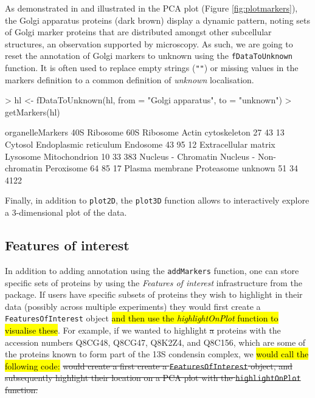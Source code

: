As demonstrated in \cite{hyper} and illustrated in the PCA plot
(Figure \ref{fig:plotmarkers}), the Golgi apparatus proteins (dark
brown) display a dynamic pattern, noting sets of Golgi marker proteins
that are distributed amongst other subcellular structures, an
observation supported by microscopy.  As such, we are going to reset
the annotation of Golgi markers to unknown using the
\texttt{fDataToUnknown} function. It is often used to replace empty
strings (\texttt{""}) or missing values in the markers definition to a
common definition of \textit{unknown} localisation.

\begin{Schunk}
\begin{Sinput}
> hl <- fDataToUnknown(hl, from = "Golgi apparatus", to = "unknown")
> getMarkers(hl)
\end{Sinput}
\begin{Soutput}
organelleMarkers
           40S Ribosome            60S Ribosome      Actin cytoskeleton 
                     27                      43                      13 
                Cytosol   Endoplasmic reticulum                Endosome 
                     43                      95                      12 
   Extracellular matrix                Lysosome           Mitochondrion 
                     10                      33                     383 
    Nucleus - Chromatin Nucleus - Non-chromatin              Peroxisome 
                     64                      85                      17 
        Plasma membrane              Proteasome                 unknown 
                     51                      34                    4122 
\end{Soutput}
\end{Schunk}

Finally, in addition to \texttt{plot2D}, the \texttt{plot3D} function
allows to interactively explore a 3-dimensional plot of the data.

\subsection*{Features of interest}
In addition to adding annotation using the \texttt{addMarkers}
function, one can store specific sets of proteins by using the
\textit{Features of interest} infrastructure from the
 package. If users have specific subsets of proteins
they wish to highlight in their data (possibly across multiple
experiments) they would first create a \texttt{FeaturesOfInterest}
object \hl{and then use the \textit{highlightOnPlot} function to 
visualise these}. For example, if we wanted to highlight \sout{a} 
proteins with the accession numbers Q8CG48, Q8CG47, Q8K2Z4, and Q8C156, 
which are some of the proteins known to form part of the 13S condensin complex, 
we \hl{would call the following code:}
\sout{would create a first create a \texttt{FeaturesOfInterest} object, and
subsequently highlight their location on a PCA plot with the
\texttt{highlightOnPlot} function.}



